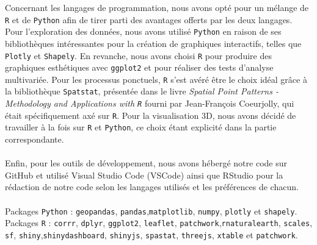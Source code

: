\documentclass[12pt]{article}
\begin{document}
Concernant les langages de programmation, nous avons opté pour un mélange de \texttt{R} et de \texttt{Python} afin de tirer parti des avantages offerts par les deux langages. Pour l'exploration des données, nous avons utilisé \texttt{Python} en raison de ses bibliothèques intéressantes pour la création de graphiques interactifs, telles que \texttt{Plotly} et \texttt{Shapely}. En revanche, nous avons choisi \texttt{R} pour produire des graphiques esthétiques avec \texttt{ggplot2} et pour réaliser des tests d'analyse multivariée. Pour les processus ponctuels, \texttt{R} s'est avéré être le choix idéal grâce à la bibliothèque \texttt{Spatstat},  présentée dans le livre \textit{Spatial Point Patterns - Methodology and Applications with \texttt{R}} \cite{analysing_spacial_points} fourni par Jean-François Coeurjolly, qui était spécifiquement axé sur \texttt{R}. Pour la visualisation 3D, nous avons décidé de travailler à la fois sur \texttt{R} et \texttt{Python}, ce choix étant explicité dans la partie correspondante.\\
\\
Enfin, pour les outils de développement, nous avons hébergé notre code sur GitHub et utilisé Visual Studio Code (VSCode) ainsi que RStudio pour la rédaction de notre code selon les langages utilisés et les préférences de chacun.\\
\\
Packages \texttt{Python} : \texttt{geopandas}, \texttt{pandas},\texttt{matplotlib}, \texttt{numpy}, \texttt{plotly} et \texttt{shapely}.\\
Packages \texttt{R} : \texttt{corrr}, \texttt{dplyr}, \texttt{ggplot2}, \texttt{leaflet}, \texttt{patchwork},\texttt{rnaturalearth}, \texttt{scales}, \texttt{sf}, \texttt{shiny},\texttt{shinydashboard}, \texttt{shinyjs}, \texttt{spastat}, \texttt{threejs}, \texttt{xtable} et 
\texttt{patchwork}.
\newpage
\end{document}

